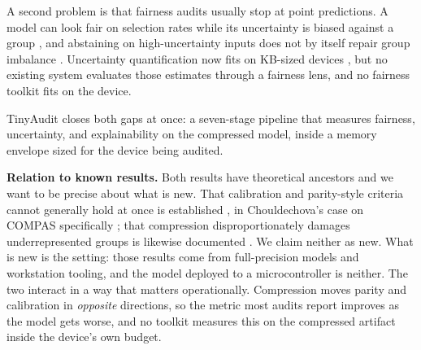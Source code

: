 \documentclass{article}
\begin{document}
A second problem is that fairness audits usually stop at point predictions. A model can look fair on selection rates while its uncertainty is biased against a group \cite{kuzucu2024}, and abstaining on high-uncertainty inputs does not by itself repair group imbalance \cite{rosenblatt2024}. Uncertainty quantification now fits on KB-sized devices \cite{ghanathe2025}, but no existing system evaluates those estimates through a fairness lens, and no fairness toolkit fits on the device.

TinyAudit closes both gaps at once: a seven-stage pipeline that measures fairness, uncertainty, and explainability on the compressed model, inside a memory envelope sized for the device being audited.

\textbf{Relation to known results.} Both results have theoretical ancestors and we want to be precise about what is new. That calibration and parity-style criteria cannot generally hold at once is established \cite{kleinberg2017,pleiss2017}, in Chouldechova's case on COMPAS specifically \cite{chouldechova2017}; that compression disproportionately damages underrepresented groups is likewise documented \cite{hooker2020,blakeney2021}. We claim neither as new. What is new is the setting: those results come from full-precision models and workstation tooling, and the model deployed to a microcontroller is neither. The two interact in a way that matters operationally. Compression moves parity and calibration in \emph{opposite} directions, so the metric most audits report improves as the model gets worse, and no toolkit measures this on the compressed artifact inside the device's own budget.
\end{document}
